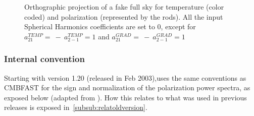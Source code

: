 \documentclass[12pt,twoside]{article}
\begin{document}
\begin{figure}[!ht]
\caption[T and P]%
{\label{fig:orthpol}%
Orthographic projection of a fake full sky for temperature (color
coded) and polarization (represented by the rods). All the input Spherical
Harmonics coefficients are set to 0, except for
$a_{21}^{TEMP}=\ -\ a_{2-1}^{TEMP}=1$ and
$a_{21}^{GRAD}=\ -\ a_{2-1}^{GRAD}=1$}
\end{figure}

\subsubsection{Internal convention}
Starting with version 1.20 (released in Feb 2003),\healpix uses the same
conventions as CMBFAST for the sign and normalization of the polarization power
spectra, as exposed below (adapted from \citet{zalda}). How this relates to
what was used in previous releases is exposed in~\ref{subsub:relatoldversion}.
\end{document}
